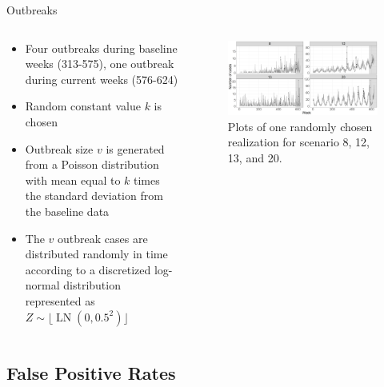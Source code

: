 \documentclass[aspectratio=169,handout]{beamer}
\DeclareMathOperator{\LN}{LN}
\begin{document}
\begin{frame}{Outbreaks}
\begin{columns}
\begin{column}{.50\textwidth}
\begin{itemize}
  \item Four outbreaks during baseline weeks (313-575), one outbreak during current weeks (576-624)
  \item Random constant value $k$ is chosen
  \item Outbreak size $v$ is generated from a Poisson distribution with mean equal to $k$ times the standard deviation from the baseline data
  \item The $v$ outbreak cases are distributed randomly in time according to a discretized log-normal distribution represented as $Z \sim \lfloor \LN(0,0.5^2)\rfloor$
\end{itemize}
\end{column}
\hfill
\begin{column}{.46\textwidth}

 \tiny

\begin{figure}[H]
\includegraphics[width=1\linewidth]{../../figures/Realizations} \caption{Plots of one randomly chosen realization for scenario 8, 12, 13, and 20.}\label{fig:Realizations}
\end{figure}

 \normalsize
\end{column}
\end{columns}
\end{frame}

\hypertarget{false-positive-rates}{%
\subsection{False Positive Rates}\label{false-positive-rates}}
\end{document}
